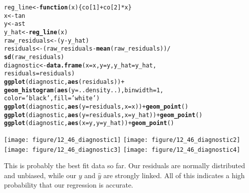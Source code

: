 \documentclass[10pt]{article}\usepackage[]{graphicx}\usepackage[]{xcolor}
\makeatletter
\newcommand{\hlnum}[1]{\textcolor[rgb]{0.686,0.059,0.569}{#1} }%
\newcommand{\hlstr}[1]{\textcolor[rgb]{0.192,0.494,0.8}{#1} }%
\newcommand{\hlopt}[1]{\textcolor[rgb]{0,0,0}{#1} }%
\newcommand{\hlstd}[1]{\textcolor[rgb]{0.345,0.345,0.345}{#1} }%
\newcommand{\hlkwa}[1]{\textcolor[rgb]{0.161,0.373,0.58}{\textbf{#1} } }%
\newcommand{\hlkwb}[1]{\textcolor[rgb]{0.69,0.353,0.396}{#1} }%
\newcommand{\hlkwc}[1]{\textcolor[rgb]{0.333,0.667,0.333}{#1} }%
\newcommand{\hlkwd}[1]{\textcolor[rgb]{0.737,0.353,0.396}{\textbf{#1} } }%
\newenvironment{kframe}{%
 \def\at@end@of@kframe{}%
 \ifinner\ifhmode%
  \def\at@end@of@kframe{\end{minipage} }%
  \begin{minipage}{\columnwidth}%
 \fi\fi%
 \def\FrameCommand##1{\hskip\@totalleftmargin \hskip-\fboxsep
 \colorbox{shadecolor}{##1}\hskip-\fboxsep
     \hskip-\linewidth \hskip-\@totalleftmargin \hskip\columnwidth}%
 \MakeFramed {\advance\hsize-\width
   \@totalleftmargin\z@ \linewidth\hsize
   \@setminipage} }%
 {\par\unskip\endMakeFramed%
 \at@end@of@kframe}
\newenvironment{knitrout}{}{} %
\makeatother
\begin{document}
\begin{easylist}[enumerate]
\begin{knitrout}
\color{fgcolor}\begin{kframe}
\begin{alltt}
         \hlstd{reg_line} \hlkwb{<-} \hlkwa{function}\hlstd{(}\hlkwc{x}\hlstd{) \{ co[}\hlnum{1}\hlstd{]} \hlopt{+} \hlstd{co[}\hlnum{2}\hlstd{]} \hlopt{*} \hlstd{x \} }
         \hlstd{x} \hlkwb{<-} \hlstd{tan}
         \hlstd{y} \hlkwb{<-} \hlstd{ast}
         \hlstd{y_hat} \hlkwb{<-} \hlkwd{reg_line}\hlstd{(x)}
         \hlstd{raw_residuals} \hlkwb{<-} \hlstd{(y} \hlopt{-} \hlstd{y_hat)}
         \hlstd{residuals} \hlkwb{<-} \hlstd{(raw_residuals} \hlopt{-} \hlkwd{mean}\hlstd{(raw_residuals))} \hlopt{/}
                         \hlkwd{sd}\hlstd{(raw_residuals)}
         \hlstd{diagnostic} \hlkwb{<-} \hlkwd{data.frame}\hlstd{(}\hlkwc{x}\hlstd{=x,} \hlkwc{y}\hlstd{=y,} \hlkwc{y_hat}\hlstd{=y_hat,}
                                  \hlkwc{residuals}\hlstd{=residuals)}
         \hlkwd{ggplot}\hlstd{(diagnostic,} \hlkwd{aes}\hlstd{(residuals))} \hlopt{+}
             \hlkwd{geom_histogram}\hlstd{(}\hlkwd{aes}\hlstd{(}\hlkwc{y}\hlstd{=..density..),} \hlkwc{binwidth}\hlstd{=}\hlnum{1}\hlstd{,}
                            \hlkwc{color}\hlstd{=}\hlstr{'black'}\hlstd{,} \hlkwc{fill}\hlstd{=}\hlstr{'white'}\hlstd{)}
         \hlkwd{ggplot}\hlstd{(diagnostic,} \hlkwd{aes}\hlstd{(}\hlkwc{y}\hlstd{=residuals,} \hlkwc{x}\hlstd{=x))} \hlopt{+} \hlkwd{geom_point}\hlstd{()}
         \hlkwd{ggplot}\hlstd{(diagnostic,} \hlkwd{aes}\hlstd{(}\hlkwc{y}\hlstd{=residuals,} \hlkwc{x}\hlstd{=y_hat))} \hlopt{+} \hlkwd{geom_point}\hlstd{()}
         \hlkwd{ggplot}\hlstd{(diagnostic,} \hlkwd{aes}\hlstd{(}\hlkwc{x}\hlstd{=y,} \hlkwc{y}\hlstd{=y_hat))} \hlopt{+} \hlkwd{geom_point}\hlstd{()}
\end{alltt}
\end{kframe}

{\centering \texttt{[image: figure/12\_46\_diagnostic1]} 
\texttt{[image: figure/12\_46\_diagnostic2]} 
\texttt{[image: figure/12\_46\_diagnostic3]} 
\texttt{[image: figure/12\_46\_diagnostic4]} 

}



\end{knitrout}


    This is probably the best fit data so far. Our residuals are normally distributed and unbiased, while our $y$ and
    $\hat{y}$ are strongly linked. All of this indicates a high probability that our regression is accurate.


\end{easylist}
\end{document}

